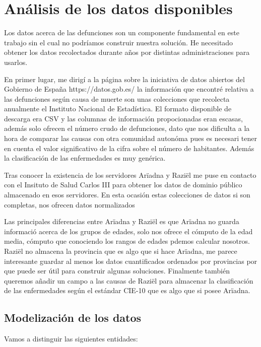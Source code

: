 \chapter{Análisis de los datos disponibles}

Los datos acerca de las defunciones son un componente fundamental en este trabajo sin
el cual no podríamos construir nuestra solución. He necesitado obtener los datos recolectados
durante años por distintas administraciones para usarlos.

En primer lugar, me dirigí a la página sobre la iniciativa de datos abiertos del 
Gobierno de España https://datos.gob.es/ la información que encontré relativa a las defunciones
según causa de muerte son unas colecciones que recolecta anualmente el Instituto
Nacional de Estadística. El formato disponible de descarga era CSV y las columnas de información
propocionadas eran escasas, además solo ofrecen el número crudo de defunciones, dato que nos dificulta 
a la hora de comparar las causas con otra comunidad autonóma pues es necesari tener en cuenta el valor significativo
de la cifra sobre el número de habitantes. Además la clasificación de las enfermedades es muy genérica.

Tras conocer la existencia de los servidores Arïadna y Raziël me puse en contacto con el Insituto de Salud Carlos
III para obtener los datos de dominio público almacenado en esos servidores. En esta ocasión estas colecciones
de datos si son completas, nos ofrecen datos normalizados 

Las principales diferencias entre Arïadna y Raziël es que Arïadna no guarda informació acerca
de los grupos de edades, solo nos ofrece el cómputo de la edad media, cómputo que conociendo
los rangos de edades pdemos calcular nosotros. 
Raziël no almacena la provincia que es algo que si hace Arïadna, me parece interesante guardar al menos
los datos cuantificados ordenados por provincias por que puede ser útil para construir algunas soluciones.
Finalmente también queremos añadir un campo a las causas de Raziël para almacenar la clasificación de las 
enfermedades según el estándar CIE-10 que es algo que si posee Arïadna.

\section{Modelización de los datos}
Vamos a distinguir las siguientes entidades: